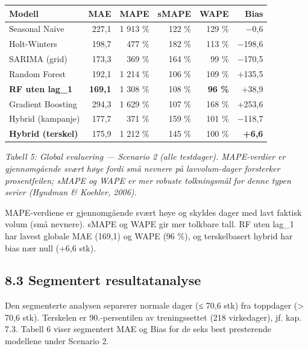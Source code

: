 \documentclass[
  norsk,
  11pt,
  a4paper,
]{article}
\newcounter{none} %
\begin{document}
{\def\LTcaptype{none} %
\begin{longtable}[]{@{}lrrrrr@{}}
\toprule\noalign{}
Modell & MAE & MAPE & sMAPE & WAPE & Bias \\
\midrule\noalign{}
\endhead
\bottomrule\noalign{}
\endlastfoot
Seasonal Naive & 227,1 & 1 913 \% & 122 \% & 129 \% & −0,6 \\
Holt-Winters & 198,7 & 477 \% & 182 \% & 113 \% & −198,6 \\
SARIMA (grid) & 173,3 & 369 \% & 164 \% & 99 \% & −170,5 \\
Random Forest & 192,1 & 1 214 \% & 106 \% & 109 \% & +135,5 \\
\textbf{RF uten lag\_1} & \textbf{169,1} & 1 308 \% & 108 \% &
\textbf{96 \%} & +38,9 \\
Gradient Boosting & 294,3 & 1 629 \% & 107 \% & 168 \% & +253,6 \\
Hybrid (kampanje) & 177,7 & 371 \% & 159 \% & 101 \% & −118,7 \\
\textbf{Hybrid (terskel)} & 175,9 & 1 212 \% & 145 \% & 100 \% &
\textbf{+6,6} \\
\end{longtable}
}

{\centering\small

\emph{Tabell 5: Global evaluering --- Scenario 2 (alle testdager).
MAPE-verdier er gjennomgående svært høye fordi små nevnere på
lavvolum-dager forsterker prosentfeilen; sMAPE og WAPE er mer robuste
tolkningsmål for denne typen serier (Hyndman \& Koehler, 2006).}

\par}

MAPE-verdiene er gjennomgående svært høye og skyldes dager med lavt
faktisk volum (små nevnere). sMAPE og WAPE gir mer tolkbare tall. RF
uten lag\_1 har lavest globale MAE (169,1) og WAPE (96 \%), og
terskelbasert hybrid har bias nær null (+6,6 stk).

\subsection{8.3 Segmentert
resultatanalyse}\label{segmentert-resultatanalyse}

Den segmenterte analysen separerer normale dager (≤ 70,6 stk) fra
toppdager (\textgreater{} 70,6 stk). Terskelen er 90.-persentilen av
treningssettet (218 virkedager), jf. kap. 7.3. Tabell 6 viser segmentert
MAE og Bias for de seks best presterende modellene under Scenario 2.
\end{document}
